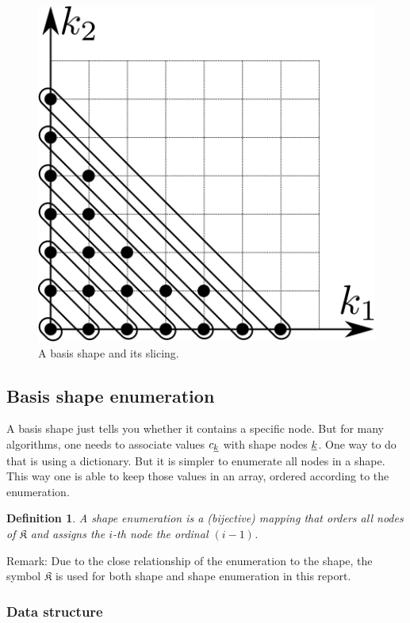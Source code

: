 \documentclass{article}
\newtheorem*{definition}{Definition}
\begin{document}
\begin{figure}[H]
  \centering
  \includegraphics[]{shape_slicing}
  \caption{A basis shape and its slicing.}
\end{figure}


\subsection{Basis shape enumeration}
A basis shape just tells you whether it contains a specific node. But
for many algorithms, one needs to associate values \(c_{\underline{k}}\) with shape
nodes \(\underline{k}\). One way to do that is using a dictionary. But it is simpler to
enumerate all nodes in a shape.  This way one is able to keep those
values in an array, ordered according to the enumeration.

\begin{definition}
  A shape enumeration is a (bijective) mapping that orders all nodes
  of \( \mathfrak{K} \)
  and assigns the \(i\)-th node the ordinal \( (i-1) \).
\end{definition}

Remark: Due to the close relationship of the enumeration to the shape,
the symbol \(\mathfrak{K}\) is used for both shape and
shape enumeration in this report.

\subsubsection{Data structure}
\end{document}

